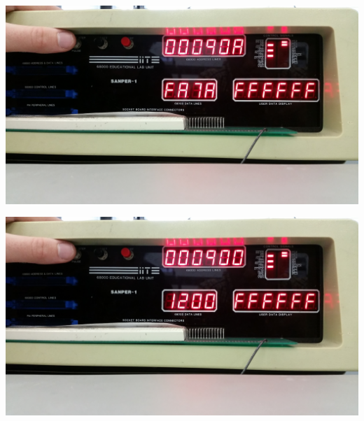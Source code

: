 \documentclass[12pt, twocolumn]{article}
\begin{document}
\begin{center}
\includegraphics[width=1\linewidth]{Lab1/20150120_094649}
\end{center}
\begin{center}
\includegraphics[width=1\linewidth]{Lab1/20150120_094651}
\end{center}
\end{document}
